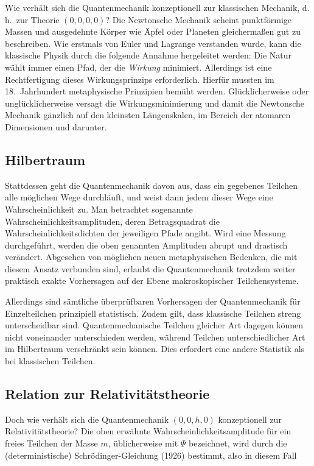 Wie verhält sich die Quantenmechanik konzeptionell zur klassischen Mechanik, d.\,h.\ zur Theorie $(0,0,0,0)$? Die Newtonsche Mechanik scheint punktförmige Massen und ausgedehnte Körper wie Äpfel oder Planeten gleichermaßen gut zu beschreiben. Wie erstmals von Euler und Lagrange verstanden wurde, kann die klassische Physik durch die folgende Annahme hergeleitet werden: Die Natur wählt immer einen Pfad, der die \emph{Wirkung} minimiert. Allerdings ist eine Rechtfertigung dieses Wirkungsprinzips erforderlich. Hierfür mussten im 18.\ Jahrhundert metaphysische Prinzipien bemüht werden. Glücklicherweise oder unglücklicherweise versagt die Wirkungsminimierung und damit die Newtonsche Mechanik gänzlich auf den kleinsten Längenskalen, im Bereich der atomaren Dimensionen und darunter.


\subsection*{Hilbertraum}

Stattdessen geht die Quantenmechanik davon aus, dass ein gegebenes Teilchen alle möglichen Wege durchläuft, und weist dann jedem dieser Wege eine Wahrscheinlichkeit zu. Man betrachtet sogenannte Wahrscheinlichkeitsamplituden, deren Betragsquadrat die Wahrscheinlichkeitsdichten der jeweiligen Pfade angibt. Wird eine Messung durchgeführt, werden die oben genannten Amplituden abrupt und drastisch verändert. Abgesehen von möglichen neuen metaphysischen Bedenken, die mit diesem Ansatz verbunden sind, erlaubt die Quantenmechanik trotzdem weiter praktisch exakte Vorhersagen auf der Ebene makroskopischer Teilchensysteme.

Allerdings sind sämtliche überprüfbaren Vorhersagen der Quantenmechanik für Einzelteilchen prinzipiell statistisch. Zudem gilt, dass klassische Teilchen streng unterscheidbar sind. Quantenmechanische Teilchen gleicher Art dagegen können nicht voneinander unterschieden werden, während Teilchen unterschiedlicher Art im Hilbertraum verschränkt sein können. Dies erfordert eine andere Statistik als bei klassischen Teilchen.


\subsection*{Relation zur Relativitätstheorie}

Doch wie verhält sich die Quantenmechanik $(0,0,h,0)$ konzeptionell zur Relativitätstheorie? Die oben erwähnte Wahrscheinlichkeitsamplitude für ein freies Teilchen der Masse $m$, üblicherweise mit $\Psi$ bezeichnet, wird durch die (deterministische) Schrödinger-Gleichung (1926) bestimmt, also in diesem Fall

